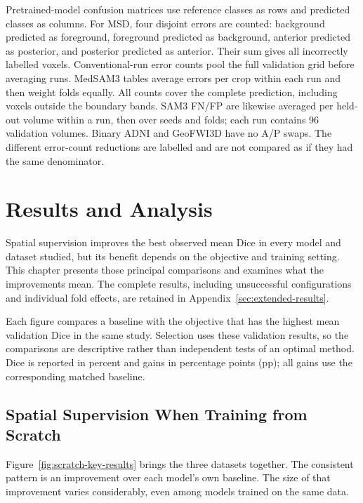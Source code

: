 \documentclass[12pt,a4paper]{article}
\begin{document}
Pretrained-model confusion matrices use reference classes as rows and
predicted classes as columns. For MSD, four disjoint errors are counted: background
predicted as foreground, foreground predicted as background, anterior
predicted as posterior, and posterior predicted as anterior. Their
sum gives all incorrectly labelled voxels. Conventional-run error counts pool the full validation grid before
averaging runs. MedSAM3 tables average errors per crop within each run
and then weight folds equally. All counts cover the complete prediction,
including voxels outside the boundary bands. SAM3 FN/FP are likewise
averaged per held-out volume within a run, then over seeds and folds;
each run contains 96 validation volumes. Binary ADNI and GeoFWI3D have
no A/P swaps. The different error-count reductions are labelled and are not compared
as if they had the same denominator.

\clearpage

\section{Results and Analysis}
\label{sec:results}

Spatial supervision improves the best observed mean Dice in every model
and dataset studied, but its benefit depends on the objective and training
setting. This chapter presents those principal comparisons and examines
what the improvements mean. The complete results, including unsuccessful
configurations and individual fold effects, are retained in
Appendix~\ref{sec:extended-results}.

Each figure compares a baseline with the objective that has the highest
mean validation Dice in the same study. Selection uses these validation
results, so the comparisons are descriptive rather than independent tests
of an optimal method. Dice is reported in percent and gains in percentage
points (pp); all gains use the corresponding matched baseline.

\subsection{Spatial Supervision When Training from Scratch}
\label{sec:geo-results}\label{sec:main-msd-results}\label{sec:adni-results}

Figure~\ref{fig:scratch-key-results} brings the three datasets together.
The consistent pattern is an improvement over each model's own baseline.
The size of that improvement varies considerably, even among models
trained on the same data.
\end{document}
